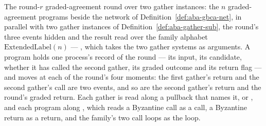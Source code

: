 \begin{definition}
  \label{def:aba-round-sub}
  \leanok
  The round-$r$ graded-agreement round over two gather instances: the $n$ graded-agreement programs beside the network of Definition~\ref{def:aba-gbca-net}, in parallel with two gather instances of Definition~\ref{def:aba-gather-sub}, the round's three events hidden and the result read over the family alphabet $\mathrm{ExtendedLabel}(n)$ --- , which takes the two gather systems as arguments.
  A program holds one process's record of the round --- its input, its candidate, whether it has called the second gather, its graded outcome and its return flag --- and moves at each of the round's four moments: the first gather's return and the second gather's call are two events, and so are the second gather's return and the round's graded return.
  Each gather is read along a pullback that names it,  or , and each program along , which reads a Byzantine call as a call, a Byzantine return as a return, and the family's two call loops as the loop.
\end{definition}
